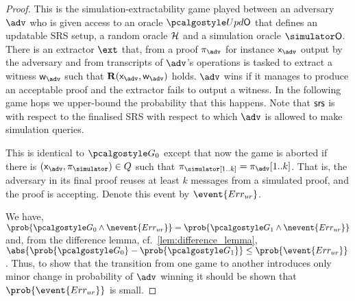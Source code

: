 \begin{proof}		

   This is the simulation-extractability game played between an adversary
  $\advse$ who is given access to an oracle $\initU$ that defines an updatable SRS setup, a random oracle $\mathcal{H}$ and a simulation oracle
  $\simO$. There is an extractor $\ext$ that, from a proof
  $\zkproof_{\advse}$ for instance $\inp_{\advse}$ output by the adversary and from
   transcripts of $\advse$'s operations is tasked to extract a witness
  $\wit_{\advse}$ such that $\REL(\inp_{\advse}, \wit_{\advse})$ holds. $\advse$ wins
  if it manages to produce an acceptable proof and the extractor fails to output a witness. In the following game hops we upper-bound the
  probability that this happens. Note that $\mathsf{srs}$ is with respect to the finalised SRS with respect to which $\adv$ is allowed to make simulation queries.

   This is identical to $\game{0}$ except that now the game is aborted
  if there is $(\inp_\advse, \zkproof_{\simulator}) \in Q$ such that $\zkproof_\simulator[1..k] = \zkproof_{\advse}[1..k]$. That is, the adversary in its final proof
  reuses at least $k$ messages from a simulated proof, and the proof is accepting.
  Denote this event by $\event{\errur}$.

    We have, \( \prob{\game{0} \land
  	\nevent{\errur}} = \prob{\game{1} \land \nevent{\errur}} \) and, from the
  difference lemma, cf.~\cref{lem:difference_lemma},
  $ \abs{\prob{\game{0}} - \prob{\game{1}}} \leq \prob{\event{\errur}}\,$.
  Thus, to show that the transition from one game to another introduces only
  minor change in probability of $\adv$ winning it should be shown that
  $\prob{\event{\errur}}$ is small.
  

\end{proof}
